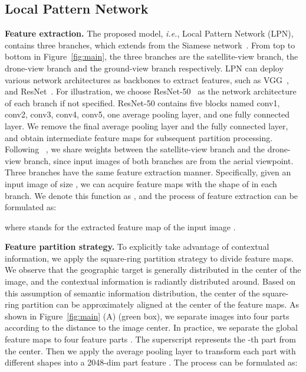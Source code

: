 \documentclass[journal]{IEEEtran}
\def\ie{\emph{i.e.}}
\begin{document}
\subsection{Local Pattern Network}
\textbf{Feature extraction.}
The proposed model, \ie, Local Pattern Network (LPN), contains three branches, which extends from the Siamese network~\cite{chopra2005learning}. From top to bottom in Figure~\ref{fig:main}, the three branches are the satellite-view branch, the drone-view branch and the ground-view branch respectively. LPN can deploy various network architectures as backbones to extract features, such as VGG~\cite{vgg}, and ResNet~\cite{he2016deep}. For illustration, we choose ResNet-50~\cite{he2016deep} as the network architecture of each branch if not specified. ResNet-50 contains five blocks named conv1, conv2, conv3, conv4, conv5, one average pooling layer, and one fully connected layer. 
We remove the final average pooling layer and the fully connected layer, and obtain intermediate feature maps for subsequent partition processing. 
Following ~\cite{zheng_university-1652_nodate}, we share weights between the satellite-view branch and the drone-view branch, since input images of both branches are from the aerial viewpoint. Three branches have the same feature extraction manner. Specifically, given an input image of size , we can acquire feature maps with the shape of  in each branch. We denote this function as , and the process of feature extraction can be formulated as:

where  stands for the extracted feature map of the input image . 

\textbf{Feature partition strategy.}\label{partition}
To explicitly take advantage of contextual information, we apply the square-ring partition strategy to divide feature maps. 
We observe that the geographic target is generally distributed in the center of the image, and the contextual information is radiantly distributed around. 
Based on this assumption of semantic information distribution, the center of the square-ring partition can be approximately aligned at the center of the feature maps. As shown in Figure~\ref{fig:main} (A) (green box), we separate images into four parts according to the distance to the image center. In practice, we separate the global feature maps  to four feature parts . The superscript  represents the -th part from the center. 
Then we apply the average pooling layer to transform each part  with different shapes into a 2048-dim part feature . The process can be formulated as:
\end{document}

